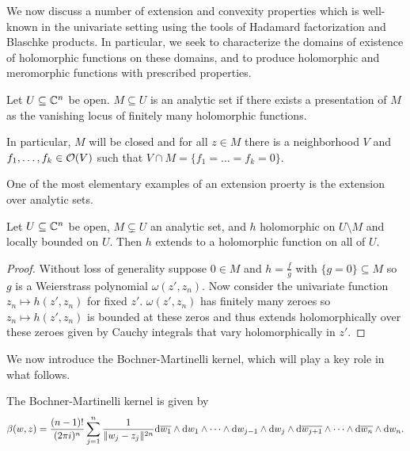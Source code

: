 We now discuss a number of extension and convexity properties which is well-known in the univariate setting using the tools of Hadamard factorization and Blaschke products. In particular, we seek to characterize the domains of existence of holomorphic functions on these domains, and to produce holomorphic and meromorphic functions with prescribed properties. 

\begin{definition}\label{def: analytic set}
    Let $U\subseteq\mathbb{C}^{n}$ be open. $M\subseteq U$ is an analytic set if there exists a presentation of $M$ as the vanishing locus of finitely many holomorphic functions. 
\end{definition}
\begin{remark}
    In particular, $M$ will be closed and for all $z\in M$ there is a neighborhood $V$ and $f_{1},\dots,f_{k}\in\mathcal{O}(V)$ such that $V\cap M=\{f_{1}=\dots=f_{k}=0\}$. 
\end{remark}
One of the most elementary examples of an extension proerty is the extension over analytic sets. 
\begin{theorem}\label{thm: first Riemann extension}
    Let $U\subseteq\mathbb{C}^{n}$ be open, $M\subsetneq U$ an analytic set, and $h$ holomorphic on $U\setminus M$ and locally bounded on $U$. Then $h$ extends to a holomorphic function on all of $U$.
\end{theorem}
\begin{proof}
    Without loss of generality suppose $0\in M$ and $h=\frac{f}{g}$ with $\{g=0\}\subseteq M$ so $g$ is a Weierstrass polynomial $\omega(z',z_{n})$. Now consider the univariate function $z_{n}\mapsto h(z',z_{n})$ for fixed $z'$. $\omega(z',z_{n})$ has finitely many zeroes so $z_{n}\mapsto h(z',z_{n})$ is bounded at these zeros and thus extends holomorphically over these zeroes given by Cauchy integrals that vary holomorphically in $z'$.  
\end{proof}
We now introduce the Bochner-Martinelli kernel, which will play a key role in what follows. 
\begin{definition}\label{def: Bochner-Martinelli kernel}
    The Bochner-Martinelli kernel is given by 
    \footnotesize
    $$\beta(w,z)=\frac{(n-1)!}{(2\pi i)^{n}}\sum_{j=1}^{n}\frac{1}{\Vert w_{j}-z_{j}\Vert^{2n}}\mathrm{d}\overline{w_{1}}\wedge\mathrm{d} w_{1}\wedge\dots\wedge\mathrm{d} w_{j-1}\wedge\mathrm{d} w_{j}\wedge \mathrm{d}\overline{w_{j+1}}\wedge\dots\wedge\mathrm{d}\overline{w_{n}}\wedge\mathrm{d} w_{n}.$$
    \large
\end{definition}
